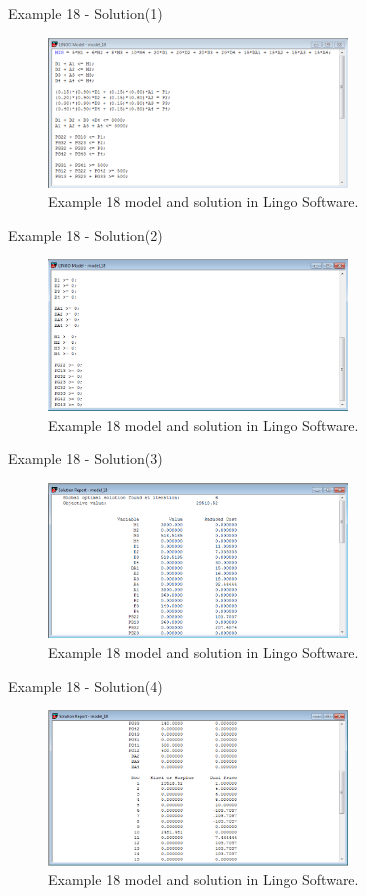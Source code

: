 \begin{frame}{Example 18 - Solution(1)}
\begin{figure}
    \includegraphics[width=300px]{slides/ex18/screenshot_a.png}
    \caption{Example 18 model and solution in Lingo Software.}
\end{figure}
\end{frame}

\begin{frame}{Example 18 - Solution(2)}
\begin{figure}
    \includegraphics[width=300px]{slides/ex18/screenshot_b.png}
    \caption{Example 18 model and solution in Lingo Software.}
\end{figure}
\end{frame}

\begin{frame}{Example 18 - Solution(3)}
\begin{figure}
    \includegraphics[width=300px]{slides/ex18/screenshot_c.png}
    \caption{Example 18 model and solution in Lingo Software.}
\end{figure}
\end{frame}

\begin{frame}{Example 18 - Solution(4)}
\begin{figure}
    \includegraphics[width=300px]{slides/ex18/screenshot_d.png}
    \caption{Example 18 model and solution in Lingo Software.}
\end{figure}
\end{frame}

